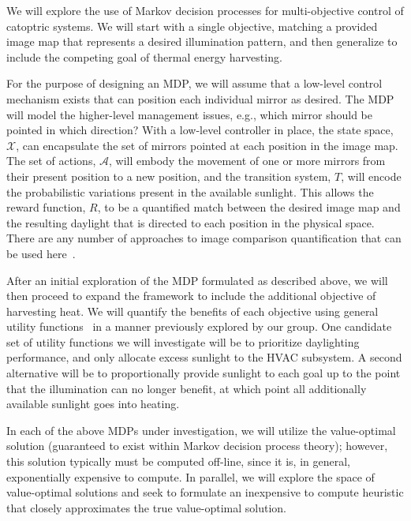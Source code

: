 We will explore the use of Markov decision processes for multi-objective
control of catoptric systems.  We will start with a single objective,
matching a provided image map that represents a desired illumination pattern,
and then generalize to include the competing goal of thermal energy
harvesting.

For the purpose of designing an MDP, we will assume that a low-level
control mechanism exists that can position each individual mirror as
desired.  The MDP will model the higher-level management issues, e.g.,
which mirror should be pointed in which direction?
With a low-level controller in place, the state space, $\mathcal{X}$,
can encapsulate the set of mirrors pointed at each position in
the image map.  The set of actions, $\mathcal{A}$, will embody the movement
of one or more mirrors from their present position to a new position,
and the transition system, $T$, will encode the probabilistic variations
present in the available sunlight.  This allows the reward function, $R$,
to be a quantified match between the desired image map and the resulting
daylight that is directed to each position in the physical space.
There are any number of approaches to image comparison quantification
that can be used here~\cite{ds99,my09,wbo97}.

After an initial exploration of the MDP formulated as described above,
we will then proceed to expand the framework to include the additional
objective of harvesting heat.  We will quantify the benefits of each
objective using general utility functions~\cite{tggs10} in a manner previously
explored by our group. One candidate set of utility functions we will
investigate will be to prioritize daylighting performance, and only
allocate excess sunlight to the HVAC subsystem. A second alternative
will be to proportionally provide sunlight to each goal up to the point
that the illumination can no longer benefit, at which point all additionally
available sunlight goes into heating.


In each of the above MDPs under investigation, we will utilize the
value-optimal solution (guaranteed to exist within Markov decision process
theory); however, this solution typically must be computed off-line, since
it is, in general, exponentially expensive to compute.  In parallel, we
will explore the space of value-optimal solutions and seek to formulate
an inexpensive to compute heuristic that closely approximates the
true value-optimal solution.

